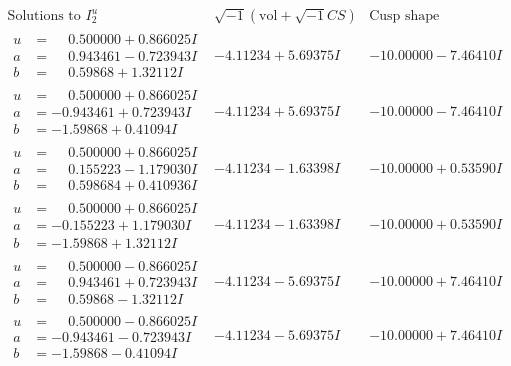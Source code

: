 \documentclass[1p]{elsarticle_modified}
\theoremstyle{definition}
\newcommand{\I}{\sqrt{-1}}
\begin{document}
$$\begin{array}{c|c|c}  
\text{Solutions to }I^u_{2}& \I (\text{vol} + \sqrt{-1}CS) & \text{Cusp shape}\\
 \hline 
\begin{aligned}
u &= \phantom{-}0.500000 + 0.866025 I \\
a &= \phantom{-}0.943461 - 0.723943 I \\
b &= \phantom{-}0.59868 + 1.32112 I\end{aligned}
 & -4.11234 + 5.69375 I & -10.00000 - 7.46410 I \\ \hline\begin{aligned}
u &= \phantom{-}0.500000 + 0.866025 I \\
a &= -0.943461 + 0.723943 I \\
b &= -1.59868 + 0.41094 I\end{aligned}
 & -4.11234 + 5.69375 I & -10.00000 - 7.46410 I \\ \hline\begin{aligned}
u &= \phantom{-}0.500000 + 0.866025 I \\
a &= \phantom{-}0.155223 - 1.179030 I \\
b &= \phantom{-}0.598684 + 0.410936 I\end{aligned}
 & -4.11234 - 1.63398 I & -10.00000 + 0.53590 I \\ \hline\begin{aligned}
u &= \phantom{-}0.500000 + 0.866025 I \\
a &= -0.155223 + 1.179030 I \\
b &= -1.59868 + 1.32112 I\end{aligned}
 & -4.11234 - 1.63398 I & -10.00000 + 0.53590 I \\ \hline\begin{aligned}
u &= \phantom{-}0.500000 - 0.866025 I \\
a &= \phantom{-}0.943461 + 0.723943 I \\
b &= \phantom{-}0.59868 - 1.32112 I\end{aligned}
 & -4.11234 - 5.69375 I & -10.00000 + 7.46410 I \\ \hline\begin{aligned}
u &= \phantom{-}0.500000 - 0.866025 I \\
a &= -0.943461 - 0.723943 I \\
b &= -1.59868 - 0.41094 I\end{aligned}
 & -4.11234 - 5.69375 I & -10.00000 + 7.46410 I \\ \hline\begin{aligned}

\end{aligned}
\end{array}$$
\end{document}
